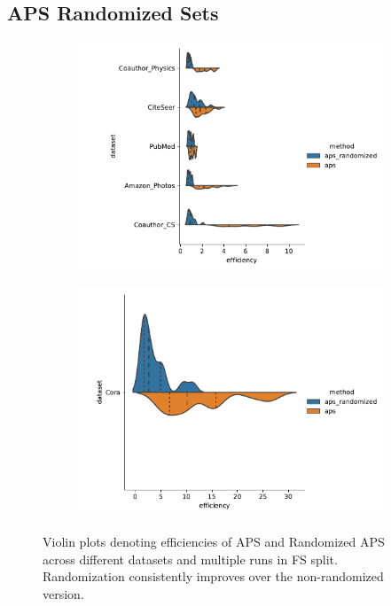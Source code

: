 \subsection{APS Randomized Sets}
\begin{figure}
    \centering
    \begin{subfigure}{0.8\linewidth}
    \includegraphics[width=\linewidth]{graphConformal/figures/split/aps_randomized_efficiency}
    \end{subfigure}
    \begin{subfigure}{0.6\linewidth}
        \includegraphics[width=\linewidth]{graphConformal/figures/split/aps_randomized_efficiency_cora}
    \end{subfigure}
    \caption{Violin plots denoting efficiencies of APS and Randomized APS across different datasets and multiple runs in FS split. Randomization consistently improves over the non-randomized version.}
    \label{fig:fs:conformal:aps_vs_randomized}
\end{figure}

